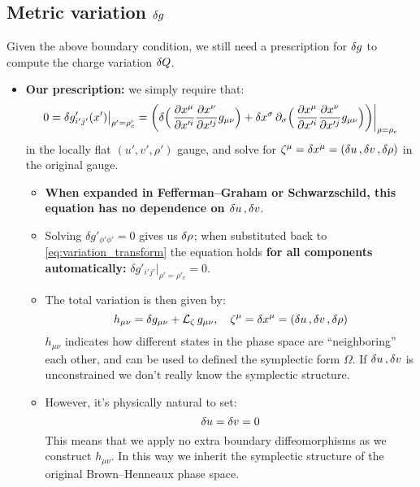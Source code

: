 \documentclass[12pt,a4paper,utf8]{article}
\begin{document}
\pagebreak

\subsection{Metric variation $\mathinner{\delta g}$}

Given the above boundary condition, we still need a prescription for $\mathinner{\delta g}$ to compute the charge variation $\mathinner{\delta Q}$. 

\begin{itemize}
\item \textbf{Our prescription:} we simply require that:
	\begin{equation}
		0 = \delta g'_{i'j'}(x')\big|_{\rho'=\rho'_c}
		= \bigg(
			\delta \Big(\,
				\frac{\partial{x^\mu}}{\partial{x'^i}}
				\frac{\partial{x^\nu}}{\partial{x'^j}}
				g_{\mu\nu}
			\Big)
			+ \delta x^\sigma\, \partial_\sigma \Big(\,
				\frac{\partial{x^\mu}}{\partial{x'^i}}
				\frac{\partial{x^\nu}}{\partial{x'^j}}
				g_{\mu\nu}
			\Big)
		\bigg) \bigg|_{\rho=\rho_c}
		\label{eq:variation_transform}
	\end{equation}
	in the locally flat $(u',v',\rho')$ gauge, and solve for $
		\zeta^\mu = \delta x^\mu
		= (\mathinner{\delta u},\mathinner{\delta v},\delta\rho)
	$ in the original gauge. 
	
	\begin{itemize}
	\item \textbf{When expanded in Fefferman--Graham or Schwarzschild, this equation has no dependence on $\mathinner{\delta u},\mathinner{\delta v}$}.
	
	\item Solving $\delta g'_{\phi'\phi'} = 0$ gives us $\mathinner{\delta \rho}$; when substituted back to \eqref{eq:variation_transform} the equation holds \textbf{for all components automatically:} $
			\delta g'_{i'j'}\big|_{\rho'=\rho'_c} = 0
		$. 
	
	\item The total variation is then given by:
		\begin{equation}
			h_{\mu\nu}
			= \delta g_{\mu\nu}
				+ \mathcal{L}_{\zeta} \,g_{\mu\nu},
		\quad
			\zeta^\mu = \delta x^\mu
			= (\mathinner{\delta u},\mathinner{\delta v},\delta\rho)
		\label{varimetric}
		\end{equation}
		$h_{\mu\nu}$ indicates how different states in the phase space are ``neighboring'' each other, and can be used to defined the symplectic form $\Omega$. If $\mathinner{\delta u},\mathinner{\delta v}$ is unconstrained we don't really know the symplectic structure. 
	
	\color{purple}
	\item However, it's physically natural to set:
		\begin{equation}
			\mathinner{\delta u} = \mathinner{\delta v} = 0
		\end{equation}
		This means that we apply no extra boundary diffeomorphisms as we construct $h_{\mu\nu}$. In this way we inherit the symplectic structure of the original Brown--Henneaux phase space. 
		

\end{itemize}
\end{itemize}
\end{document}
